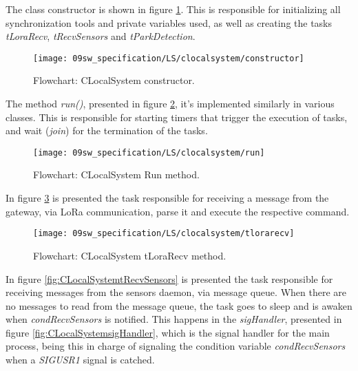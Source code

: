 
The class constructor is shown in figure \ref{fig:CLocalSystemConstructor}. This is responsible for initializing all synchronization tools and private variables used, as well as creating the tasks \textit{tLoraRecv}, \textit{tRecvSensors} and \textit{tParkDetection}.

\begin{figure}[H]
	\centering
	\texttt{[image: 09sw\_specification/LS/clocalsystem/constructor]}
	\caption{Flowchart: CLocalSystem constructor.}
	\label{fig:CLocalSystemConstructor}
\end{figure}

\clearpage
The method \textit{run()}, presented in figure \ref{fig:CLocalSystemRun}, it's implemented similarly in various classes. This is responsible for starting timers that trigger the execution of tasks, and wait (\textit{join}) for the termination of the tasks.

\begin{figure}[H]
	\centering
	\texttt{[image: 09sw\_specification/LS/clocalsystem/run]}
	\caption{Flowchart: CLocalSystem Run method.}
	\label{fig:CLocalSystemRun}
\end{figure}

\clearpage
In figure \ref{fig:CLocalSystemtLoraRecv} is presented the task responsible for receiving a message from the gateway, via LoRa communication, parse it and execute the respective command.

\begin{figure}[H]
	\centering
	\texttt{[image: 09sw\_specification/LS/clocalsystem/tlorarecv]}
	\caption{Flowchart: CLocalSystem tLoraRecv method.}
	\label{fig:CLocalSystemtLoraRecv}
\end{figure}

\clearpage
In figure \ref{fig:CLocalSystemtRecvSensors} is presented the task responsible for receiving messages from the sensors daemon, via message queue. When there are no messages to read from the message queue, the task goes to sleep and is awaken when \textit{condRecvSensors} is notified. This happens in the \textit{sigHandler}, presented in figure \ref{fig:CLocalSystemsigHandler}, which is the signal handler for the main process, being this in charge of signaling the condition variable \textit{condRecvSensors} when a \textit{SIGUSR1} signal is catched.

